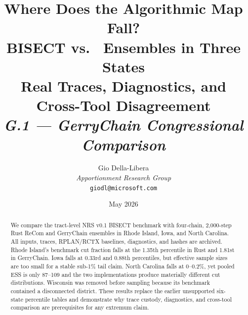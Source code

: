 \documentclass[12pt]{article}
\title{%
  \textbf{Where Does the Algorithmic Map Fall?}\\
  \textbf{BISECT vs.\ \gc{} Ensembles in Three States}\\[0.4em]
  \large Real Traces, Diagnostics, and Cross-Tool Disagreement\\[0.8em]
  \normalsize\textit{G.1 --- GerryChain Congressional Comparison}%
}
\author{%
  Gio Della-Libera\\
  \textit{Apportionment Research Group}\\
  \small\texttt{giodl@microsoft.com}
}
\date{May 2026}
\begin{document}
\maketitle

\begin{abstract}
\noindent
We compare the tract-level NRS v0.1 BISECT benchmark with four-chain,
2,000-step Rust ReCom and GerryChain ensembles in Rhode Island, Iowa, and North
Carolina.  All inputs, traces, RPLAN/RCTX baselines, diagnostics, and hashes are
archived.  Rhode Island's benchmark cut fraction falls at the 1.35th percentile
in Rust and 1.81st in GerryChain.  Iowa falls at 0.33rd and 0.88th percentiles,
but effective sample sizes are too small for a stable sub-1\% tail claim.
North Carolina falls at 0--0.2\%, yet pooled ESS is only 87--109 and the two
implementations produce materially different cut distributions. Wisconsin was
removed before sampling because its benchmark contained a disconnected
district. These results replace the earlier unsupported six-state percentile
tables and demonstrate why trace custody, diagnostics, and cross-tool
comparison are prerequisites for any extremum claim.
\end{abstract}

\tableofcontents
\newpage





\end{document}

